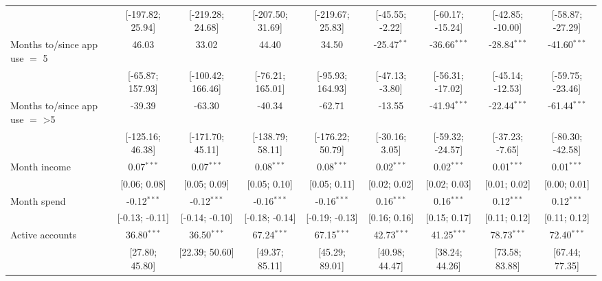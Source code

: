 \begin{table}[htbp]
\begin{threeparttable}[b]
\begin{tabular}{lcccccccc}
                                         & [-197.82; 25.94]  & [-219.28; 24.68]  & [-207.50; 31.69]  & [-219.67; 25.83]  & [-45.55; -2.22]    & [-60.17; -15.24] & [-42.85; -10.00]   & [-58.87; -27.29]\\   
         Months to/since app use $=$ 5   & 46.03             & 33.02             & 44.40             & 34.50             & -25.47$^{**}$      & -36.66$^{***}$   & -28.84$^{***}$     & -41.60$^{***}$\\   
                                         & [-65.87; 157.93]  & [-100.42; 166.46] & [-76.21; 165.01]  & [-95.93; 164.93]  & [-47.13; -3.80]    & [-56.31; -17.02] & [-45.14; -12.53]   & [-59.75; -23.46]\\   
         Months to/since app use $=$ >5  & -39.39            & -63.30            & -40.34            & -62.71            & -13.55             & -41.94$^{***}$   & -22.44$^{***}$     & -61.44$^{***}$\\   
                                         & [-125.16; 46.38]  & [-171.70; 45.11]  & [-138.79; 58.11]  & [-176.22; 50.79]  & [-30.16; 3.05]     & [-59.32; -24.57] & [-37.23; -7.65]    & [-80.30; -42.58]\\   
         Month income                    & 0.07$^{***}$      & 0.07$^{***}$      & 0.08$^{***}$      & 0.08$^{***}$      & 0.02$^{***}$       & 0.02$^{***}$     & 0.01$^{***}$       & 0.01$^{***}$\\   
                                         & [0.06; 0.08]      & [0.05; 0.09]      & [0.05; 0.10]      & [0.05; 0.11]      & [0.02; 0.02]       & [0.02; 0.03]     & [0.01; 0.02]       & [0.00; 0.01]\\   
         Month spend                     & -0.12$^{***}$     & -0.12$^{***}$     & -0.16$^{***}$     & -0.16$^{***}$     & 0.16$^{***}$       & 0.16$^{***}$     & 0.12$^{***}$       & 0.12$^{***}$\\   
                                         & [-0.13; -0.11]    & [-0.14; -0.10]    & [-0.18; -0.14]    & [-0.19; -0.13]    & [0.16; 0.16]       & [0.15; 0.17]     & [0.11; 0.12]       & [0.11; 0.12]\\   
         Active accounts                 & 36.80$^{***}$     & 36.50$^{***}$     & 67.24$^{***}$     & 67.15$^{***}$     & 42.73$^{***}$      & 41.25$^{***}$    & 78.73$^{***}$      & 72.40$^{***}$\\   
                                         & [27.80; 45.80]    & [22.39; 50.60]    & [49.37; 85.11]    & [45.29; 89.01]    & [40.98; 44.47]     & [38.24; 44.26]   & [73.58; 83.88]     & [67.44; 77.35]\\   

\end{tabular}
\end{threeparttable}
\end{table}

